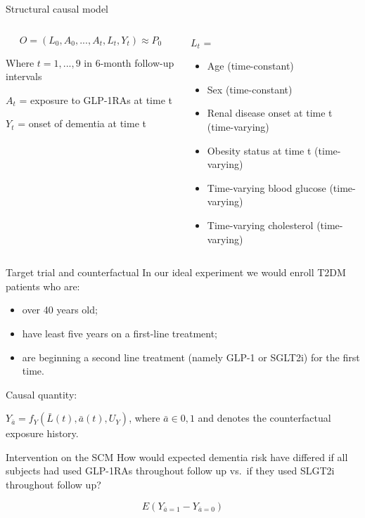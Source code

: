 \documentclass[
  ignorenonframetext,
  twocolumn]{beamer}
\providecommand{\tightlist}{%
  \setlength{\itemsep}{0pt}\setlength{\parskip}{0pt}}
\renewcommand{\tightlist}{\setlength{\itemsep}{2ex}\setlength{\parskip}{0pt}}
\begin{document}
\begin{frame}{Structural causal model}
\protect\hypertarget{structural-causal-model}{}
\begin{columns}[T]
\begin{column}{0.48\textwidth}
\[O = (L_0, A_0, ..., A_t, L_t, Y_t)  \approx P_0 \]

Where \(t = 1,...,9\) in 6-month follow-up intervals

\(A_t\) = exposure to GLP-1RAs at time t

\(Y_t\) = onset of dementia at time t
\end{column}

\begin{column}{0.48\textwidth}
\(L_t\) =

\begin{itemize}
  \item Age (time-constant)
  \item Sex (time-constant)
  \item Renal disease onset at time t (time-varying)
  \item Obesity status at time t (time-varying)
  \item Time-varying blood glucose (time-varying)
  \item Time-varying cholesterol (time-varying)
\end{itemize}
\end{column}
\end{columns}
\end{frame}

\begin{frame}{Target trial and counterfactual}
\protect\hypertarget{target-trial-and-counterfactual}{}
In our ideal experiment we would enroll T2DM patients who are:

\begin{itemize}
\tightlist
\item
  over 40 years old;
\item
  have least five years on a first-line treatment;
\item
  are beginning a second line treatment (namely GLP-1 or SGLT2i) for the
  first time.
\end{itemize}

Causal quantity:

\(Y_{\bar{a}} = f_Y(\bar{L}(t),\bar{a}(t), U_{Y})\), where
\(\bar{a} \in {0,1}\) and denotes the counterfactual exposure history.
\end{frame}

\begin{frame}{Intervention on the SCM}
\protect\hypertarget{intervention-on-the-scm}{}
How would expected dementia risk have differed if all subjects had used
GLP-1RAs throughout follow up vs.~if they used SLGT2i throughout follow
up?

\[ E(Y_{\bar{a}=1}-Y_{\bar{a}=0}) \]
\end{frame}
\end{document}
